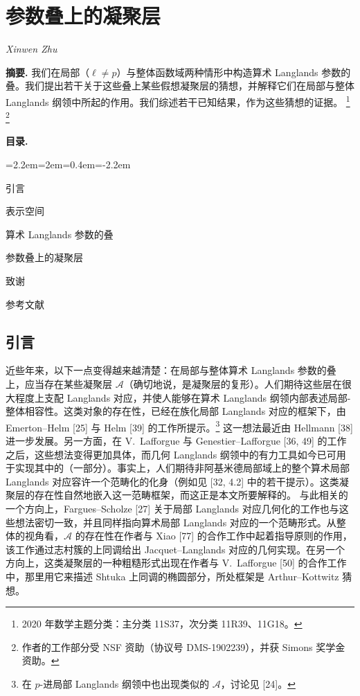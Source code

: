 \chapter{参数叠上的凝聚层}
\begin{center}
{\small\itshape Xinwen Zhu}
\end{center}
\medskip
\noindent\textbf{摘要.} 我们在局部（$\ell\ne p$）与整体函数域两种情形中构造算术 Langlands 参数的叠。我们提出若干关于这些叠上某些假想凝聚层的猜想，并解释它们在局部与整体 Langlands 纲领中所起的作用。我们综述若干已知结果，作为这些猜想的证据。
\footnote{2020 年数学主题分类：主分类 11S37，次分类 11R39、11G18。}
\footnote{作者的工作部分受 NSF 资助（协议号 DMS-1902239），并获 Simons 奖学金资助。}

\medskip
\noindent\textbf{目录.}
\begin{list}{}{\leftmargin=2.2em=2em=0.4em\itemindent=-2.2em}
\item 引言
\item 表示空间
\item 算术 Langlands 参数的叠
\item 参数叠上的凝聚层
\item 致谢
\item 参考文献
\end{list}

\section{引言}

近些年来，以下一点变得越来越清楚：在局部与整体算术 Langlands 参数的叠上，应当存在某些凝聚层 $\mathcal A$（确切地说，是凝聚层的复形）。人们期待这些层在很大程度上支配 Langlands 对应，并使人能够在算术 Langlands 纲领内部表述局部-整体相容性。这类对象的存在性，已经在族化局部 Langlands 对应的框架下，由 Emerton–Helm [25] 与 Helm [39] 的工作所提示。\footnote{在 $p$-进局部 Langlands 纲领中也出现类似的 $\mathcal A$，讨论见 [24]。} 这一想法最近由 Hellmann [38] 进一步发展。另一方面，在 V.~Lafforgue 与 Genestier–Lafforgue [36, 49] 的工作之后，这些想法变得更加具体，而几何 Langlands 纲领中的有力工具如今已可用于实现其中的（一部分）。事实上，人们期待非阿基米德局部域上的整个算术局部 Langlands 对应容许一个范畴化的化身（例如见 [32, 4.2] 中的若干提示）。这类凝聚层的存在性自然地嵌入这一范畴框架，而这正是本文所要解释的。
与此相关的一个方向上，Fargues–Scholze [27] 关于局部 Langlands 对应几何化的工作也与这些想法密切一致，并且同样指向算术局部 Langlands 对应的一个范畴形式。从整体的视角看，$\mathcal A$ 的存在性在作者与 Xiao [77] 的合作工作中起着指导原则的作用，该工作通过志村簇的上同调给出 Jacquet–Langlands 对应的几何实现。在另一个方向上，这类凝聚层的一种粗糙形式出现在作者与 V.~Lafforgue [50] 的合作工作中，那里用它来描述 Shtuka 上同调的椭圆部分，所处框架是 Arthur–Kottwitz 猜想。

